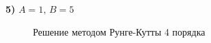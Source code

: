	
		\newpage
		\thispagestyle{empty}
		\begin{landscape}
			\textbf{5)} $A = 1$, $B = 5$	
			\begin{figure}[h!]
				\begin{minipage}[h]{0.55\linewidth}
				\end{minipage}
				\hfill
				\begin{minipage}[h]{0.55\linewidth}
				\end{minipage}
				\caption{Решение методом Рунге-Кутты 4 порядка}
			\end{figure}
			\fillandplacepagenumber
		\end{landscape}
		
